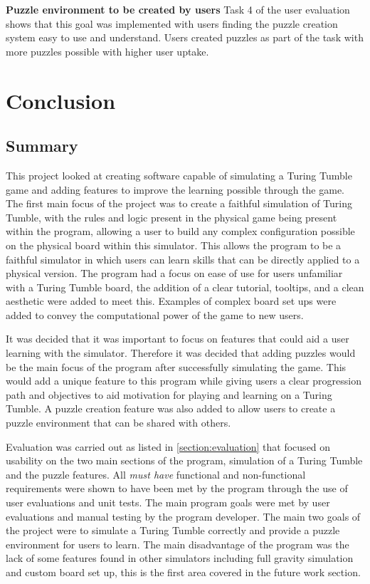 \documentclass{l4proj}
\begin{document}
\textbf{Puzzle environment to be created by users} Task 4 of the user evaluation shows that this goal was implemented with users finding the puzzle creation system easy to use and understand. Users created puzzles as part of the task with more puzzles possible with higher user uptake. 





\chapter{Conclusion}
\section{Summary}
This project looked at creating software capable of simulating a Turing Tumble game and adding features to improve the learning possible through the game. The first main focus of the project was to create a faithful simulation of Turing Tumble, with the rules and logic present in the physical game being present within the program, allowing a user to build any complex configuration possible on the physical board within this simulator. This allows the program to be a faithful simulator in which users can learn skills that can be directly applied to a physical version. The program had a focus on ease of use for users unfamiliar with a Turing Tumble board, the addition of a clear tutorial, tooltips, and a clean aesthetic were added to meet this. Examples of complex board set ups were added to convey the computational power of the game to new users. 

It was decided that it was important to focus on features that could aid a user learning with the simulator. Therefore it was decided that adding puzzles would be the main focus of the program after successfully simulating the game. This would add a unique feature to this program while giving users a clear progression path and objectives to aid motivation for playing and learning on a Turing Tumble. A puzzle creation feature was also added to allow users to create a puzzle environment that can be shared with others. 

Evaluation was carried out as listed in \ref{section:evaluation} that focused on usability on the two main sections of the program, simulation of a Turing Tumble and the puzzle features. All \emph{must have} functional and non-functional requirements were shown to have been met by the program through the use of user evaluations and unit tests. The main program goals were met by user evaluations and manual testing by the program developer. The main two goals of the project were to simulate a Turing Tumble correctly and provide a puzzle environment for users to learn. The main disadvantage of the program was the lack of some features found in other simulators including full gravity simulation and custom board set up, this is the first area covered in the future work section.
\end{document}
